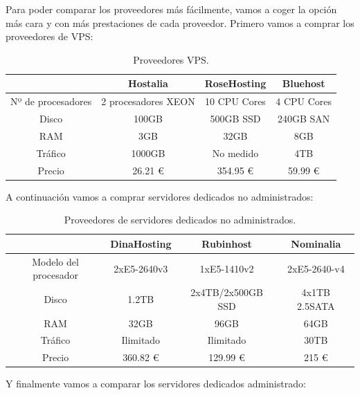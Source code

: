 \documentclass[a4paper,titlepage,12pt]{scrartcl}	%
\numberwithin{figure}{section} %
\numberwithin{table}{section} %
\begin{document}
	Para poder comparar los proveedores más fácilmente, vamos a coger la opción más cara y con más prestaciones de cada proveedor. Primero vamos a comprar los proveedores de VPS:
		
	\begin{table}[H]
		\centering
		\begin{tabular}{|c|c|c|c|}
			\hline
			& Hostalia \cite{HostaliaVPS} & RoseHosting \cite{RoseHostingVPS} & Bluehost \cite{BluehostVPS}\\
			\hline
			Nº de procesadores & 2 procesadores XEON & 10 CPU Cores & 4 CPU Cores\\
			\hline
			Disco & 100GB & 500GB SSD & 240GB SAN\\
			\hline
			RAM & 3GB & 32GB & 8GB\\
			\hline
			Tráfico & 1000GB & No medido & 4TB\\
			\hline
			Precio & 26.21 \euro & 354.95 \euro & 59.99 \euro\\
			\hline
		\end{tabular}
		\caption[Proveedores VPS.]{Proveedores VPS.}
	\end{table}
	
	A continuación vamos a comprar servidores dedicados no administrados:
	
	\begin{table}[H]
		\centering
		\begin{tabular}{|c|c|c|c|}
			\hline
			& DinaHosting \cite{DinahostingNoAdministrado} & Rubinhost \cite{RubinhostNoAdministrado} & Nominalia \cite{NominaliaNoAdministrado}\\
			\hline
			Modelo del procesador & 2xE5-2640v3 & 1xE5-1410v2 & 2xE5-2640-v4\\
			\hline
			Disco & 1.2TB & 2x4TB/2x500GB SSD & 4x1TB 2.5SATA\\
			\hline
			RAM & 32GB & 96GB & 64GB\\
			\hline
			Tráfico & Ilimitado & Ilimitado & 30TB\\
			\hline
			Precio & 360.82 \euro & 129.99 \euro & 215 \euro\\
			\hline
		\end{tabular}
		\caption[Proveedores de servidores dedicados no administrados.]{Proveedores de servidores dedicados no administrados.}
	\end{table}
	
	Y finalmente vamos a comparar los servidores dedicados administrado:
	
\end{document}
